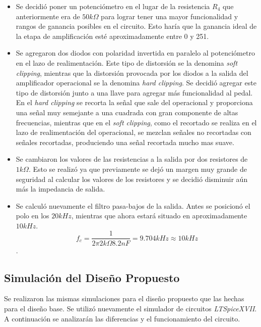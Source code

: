 \begin{itemize}
\item Se decidió poner un potenciómetro en el lugar de la resistencia $R_4$ que anteriormente era de $50k\Omega$ para lograr tener una mayor funcionalidad y rangos de ganancia posibles en el circuito. Esto haría que la ganancia ideal de la etapa de amplificación esté aproximadamente entre 0 y 251. 
\item Se agregaron dos diodos con polaridad invertida en paralelo al potenciómetro en el lazo de realimentación. Este tipo de distorsión se la denomina \textit{soft clipping}, mientras que la distorsión provocada por los diodos a la salida del amplificador operacional se la denomina \textit{hard clipping}. Se decidió agregar este tipo de distorsión junto a una llave para agregar más funcionalidad al pedal. En el \textit{hard clipping} se recorta la señal que sale del operacional y proporciona una señal muy semejante a una cuadrada con gran componente de altas frecuencias, mientras que en el \textit{soft clipping}, como el recortado se realiza en el lazo de realimentación del operacional, se mezclan señales no recortadas con señales recortadas, produciendo una señal recortada mucho mas suave.
\item Se cambiaron los valores de las resistencias a la salida por dos resistores de $1k\Omega$. Esto se realizó ya que previamente se dejó un margen muy grande de seguridad al calcular los valores de los resistores y se decidió disminuir aún más la impedancia de salida. 
\item Se calculó nuevamente el filtro pasa-bajos de la salida. Antes se posicionó el polo en los $20kHz$, mientras que ahora estará situado en  aproximadamente $10kHz$. $$ f_c = \frac{1}{2\pi 2k\Omega 8.2nF} = 9.704kHz \approx 10kHz$$.

\end{itemize}

\subsection{Simulación del Diseño Propuesto}

Se realizaron las mismas simulaciones para el diseño propuesto que las hechas para el diseño base. Se utilizó nuevamente el simulador de circuitos \textit{LTSpiceXVII}. A continuación se analizarán las diferencias y el funcionamiento del circuito.


